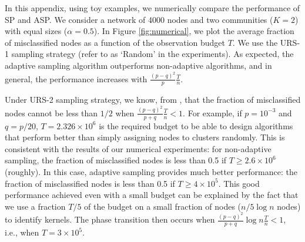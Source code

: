 In this appendix, using toy examples, we numerically compare the performance of SP and ASP. We consider a network of 4000 nodes and two communities ($K=2$) with equal sizes ($\alpha=0.5$). In Figure \ref{fig:numerical}, we plot the average fraction of misclassified nodes as a function of the observation budget $T$. We use the URS-1 sampling strategy (refer to as `Random' in the experiments). As expected, the adaptive sampling algorithm outperforms non-adaptive algorithms, and in general, the performance increases with $\frac{(p-q)^2}{p}\frac{T}{n}$. 

Under URS-2 sampling strategy, we know, from \cite{heimlicher2012community}, that the fraction of misclassified nodes cannot be less than $1/2$ when $\frac{(p-q)^2}{p+q}\frac{T}{n} < 1.$ For example, if $p=10^{-3}$ and $q=p/20$, $T = 2.326\times 10^{6}$ is the required budget to be able to design algorithms that perform better than simply assigning nodes to clusters randomly. This is consistent with the results of our numerical experiments: for non-adaptive sampling, the fraction of misclassified nodes is less than 0.5 if $T\ge 2.6\times 10^6$ (roughly). In this case, adaptive sampling provides much better performance: the fraction of misclassified nodes is less than 0.5 if $T\ge 4\times 10^5$. This good performance achieved even with a small budget can be explained by the fact that we use a fraction $T/5$ of the budget on a small fraction of nodes ($n/5 \log n$ nodes) to identify kernels. The phase transition then occurs when $\frac{(p-q)^2}{p+q}\log n \frac{T}{n} < 1$, i.e., when $T=3\times 10^5.$ 





